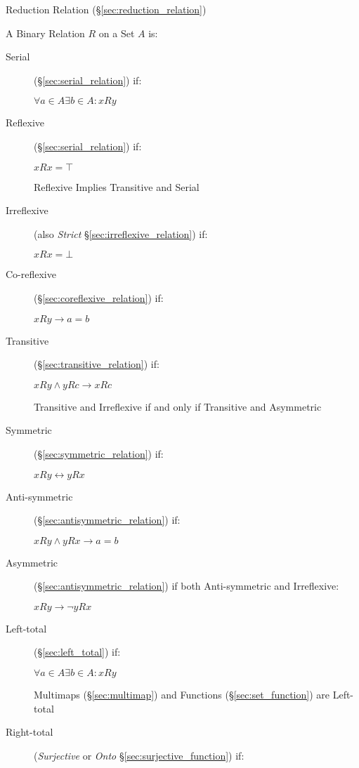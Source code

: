 Reduction Relation (\S\ref{sec:reduction_relation})

A Binary Relation $R$ on a Set $A$ is:
\begin{description}
\item[Serial](\S\ref{sec:serial_relation}) if:

  $ \forall a \in A \exists b \in A : xRy $

\item[Reflexive](\S\ref{sec:serial_relation}) if:

  $ xRx = \top $

  Reflexive Implies Transitive and Serial

\item[Irreflexive] (also \emph{Strict}
  \S\ref{sec:irreflexive_relation}) if:

  $ xRx = \bot $

\item[Co-reflexive](\S\ref{sec:coreflexive_relation}) if:

  $ xRy \rightarrow a = b $

\item[Transitive](\S\ref{sec:transitive_relation}) if:

  $ xRy \wedge yRc \rightarrow xRc $

  Transitive and Irreflexive if and only if Transitive and Asymmetric

\item[Symmetric](\S\ref{sec:symmetric_relation}) if:

  $ xRy \leftrightarrow yRx $

\item[Anti-symmetric](\S\ref{sec:antisymmetric_relation}) if:

  $ xRy \wedge yRx \rightarrow a = b $

\item[Asymmetric](\S\ref{sec:antisymmetric_relation}) if both
  Anti-symmetric and Irreflexive:

  $ xRy \rightarrow \neg yRx $

\item[Left-total] (\S\ref{sec:left_total}) if:

  $ \forall a \in A \exists b \in A : xRy $

  Multimaps (\S\ref{sec:multimap}) and Functions
  (\S\ref{sec:set_function}) are Left-total

\item[Right-total] (\emph{Surjective} or \emph{Onto}
  \S\ref{sec:surjective_function}) if:


\end{description}
